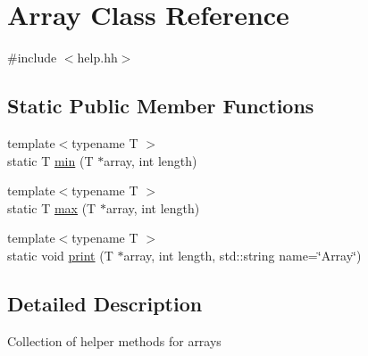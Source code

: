 \hypertarget{classArray}{\section{Array Class Reference}
\label{classArray}
}


{\ttfamily \#include $<$help.\-hh$>$}

\subsection*{Static Public Member Functions}
\begin{DoxyCompactItemize}
\item 
{\footnotesize template$<$typename T $>$ }\\static T \hyperlink{classArray_a2afa60e8e491ae59d37001a569014e41}{min} (T $\ast$array, int length)
\item 
{\footnotesize template$<$typename T $>$ }\\static T \hyperlink{classArray_a08b9fad689eb5fc9484cd63507aabb5f}{max} (T $\ast$array, int length)
\item 
{\footnotesize template$<$typename T $>$ }\\static void \hyperlink{classArray_aba3d93624f3b23b89923f7a82b5babac}{print} (T $\ast$array, int length, std\-::string name=\char`\"{}Array\char`\"{})
\end{DoxyCompactItemize}


\subsection{Detailed Description}
Collection of helper methods for arrays 

